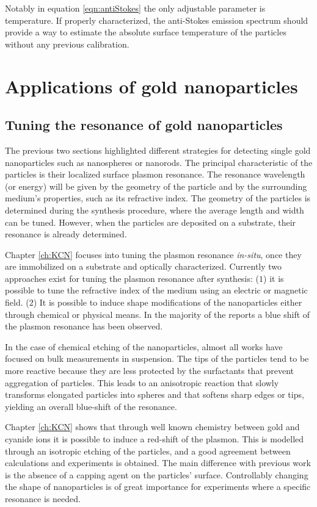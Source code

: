 Notably in equation \ref{eqn:antiStokes} the only adjustable parameter is
temperature. If properly characterized, the anti-Stokes emission spectrum should
provide a way to estimate the absolute surface temperature of the particles
without any previous calibration.

\section{Applications of gold nanoparticles}
\subsection{Tuning the resonance of gold nanoparticles}
The previous two sections highlighted different strategies for detecting single
gold nanoparticles such as nanospheres or nanorods. The principal characteristic
of the particles is their localized surface plasmon resonance. The resonance
wavelength (or energy) will be given by the geometry of the particle and by the
surrounding medium's properties, such as its refractive index. The geometry of
the particles is determined during the synthesis procedure, where the average
length and width can be tuned. However, when the particles are deposited on a
substrate, their resonance is already determined.

Chapter \ref{ch:KCN} focuses into tuning the plasmon resonance \textit{in-situ},
once they are immobilized on a substrate and optically characterized. Currently
two approaches exist for tuning the plasmon resonance after synthesis: ($1$) it
is possible to tune the refractive index of the medium using an electric or
magnetic field\cite{Kossyrev2005}. ($2$) It is possible to induce shape
modifications of the nanoparticles either through
chemical\cite{Jana2002,Rodriguez-Fernandez2005,Carbo-Argibay2007,Tsung2006,Ni2008}
or physical means\cite{Link2000,Horiguchi2008,Yorulmaz2012}. In the majority of
the reports a blue shift of the plasmon resonance has been observed.

In the case of chemical etching of the nanoparticles, almost all works have
focused on bulk measurements in suspension. The tips of the particles tend to be
more reactive because they are less protected by the surfactants that prevent
aggregation of particles. This leads to an anisotropic reaction that slowly
transforms elongated particles into spheres and that softens sharp edges or
tips, yielding an overall blue-shift of the resonance. 

Chapter \ref{ch:KCN} shows that through well known chemistry between gold and
cyanide ions it is possible to induce a red-shift of the plasmon. This is
modelled through an isotropic etching of the particles, and a good agreement
between calculations and experiments is obtained. The main difference with
previous work is the absence of a capping agent on the particles' surface.
Controllably changing the shape of nanoparticles is of great importance for
experiments where a specific resonance is needed.


